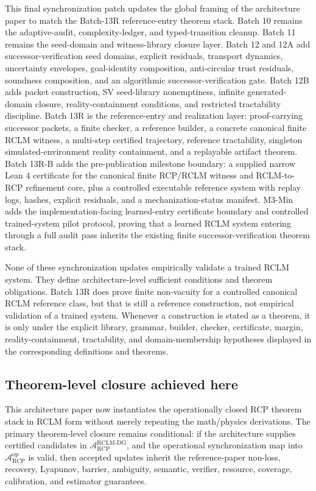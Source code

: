 \documentclass[11pt,a4paper]{article}
\newcommand{\Acal}{\mathcal A}
\newcommand{\RCP}{\mathrm{RCP}}
\newcommand{\RCLM}{\mathrm{RCLM}}
\newcommand{\DG}{\mathrm{DG}}
\begin{document}
This final synchronization patch updates the global framing of the architecture paper to match the Batch-13R reference-entry theorem stack.  Batch 10 remains the adaptive-audit, complexity-ledger, and typed-transition cleanup.  Batch 11 remains the seed-domain and witness-library closure layer.  Batch 12 and 12A add successor-verification seed domains, explicit residuals, transport dynamics, uncertainty envelopes, goal-identity composition, anti-circular trust residuals, soundness composition, and an algorithmic successor-verification gate.  Batch 12B adds packet construction, SV seed-library nonemptiness, infinite generated-domain closure, reality-containment conditions, and restricted tractability discipline.  Batch 13R is the reference-entry and realization layer: proof-carrying successor packets, a finite checker, a reference builder, a concrete canonical finite RCLM witness, a multi-step certified trajectory, reference tractability, singleton simulated-environment reality containment, and a replayable artifact theorem.  Batch 13R-B adds the pre-publication milestone boundary: a supplied narrow Lean 4 certificate for the canonical finite RCP/RCLM witness and RCLM-to-RCP refinement core, plus a controlled executable reference system with replay logs, hashes, explicit residuals, and a mechanization-status manifest.  M3-Min adds the implementation-facing learned-entry certificate boundary and controlled trained-system pilot protocol, proving that a learned RCLM system entering through a full audit pass inherits the existing finite successor-verification theorem stack.

None of these synchronization updates empirically validate a trained RCLM system.  They define architecture-level sufficient conditions and theorem obligations.  Batch 13R does prove finite non-vacuity for a controlled canonical RCLM reference class, but that is still a reference construction, not empirical validation of a trained system.  Whenever a construction is stated as a theorem, it is only under the explicit library, grammar, builder, checker, certificate, margin, reality-containment, tractability, and domain-membership hypotheses displayed in the corresponding definitions and theorems.

\subsection{Theorem-level closure achieved here}

This architecture paper now instantiates the operationally closed RCP theorem stack in RCLM form without merely repeating the math/physics derivations.  The primary theorem-level closure remains conditional: if the architecture supplies certified candidates in \(\Acal_{\RCP}^{\RCLM\text{-}\DG}\), and the operational synchronization map into \(\Acal_{\RCP}^{\mathrm{op}}\) is valid, then accepted updates inherit the reference-paper non-loss, recovery, Lyapunov, barrier, ambiguity, semantic, verifier, resource, coverage, calibration, and estimator guarantees.
\end{document}
